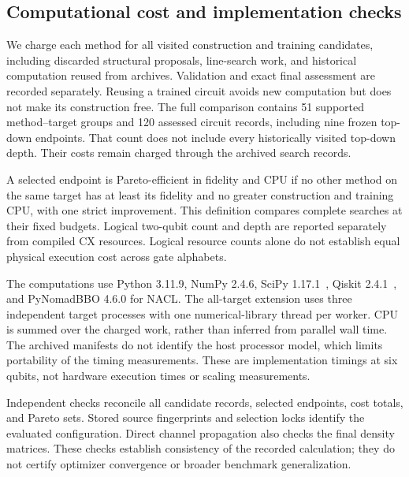 \subsection{Computational cost and implementation checks}

We charge each method for all visited construction and training candidates,
including discarded structural proposals, line-search work, and historical
computation reused from archives. Validation and exact final assessment are
recorded separately. Reusing a trained circuit avoids new computation but
does not make its construction free. The full comparison contains 51
supported method--target groups and 120 assessed circuit records, including
nine frozen top-down endpoints. That count does not include every
historically visited top-down depth. Their costs remain charged through the
archived search records.

A selected endpoint is Pareto-efficient in fidelity and CPU if no other
method on the same target has at least its fidelity and no greater
construction and training CPU, with one strict improvement. This definition
compares complete searches at their fixed budgets. Logical two-qubit count
and depth are reported separately from compiled CX resources. Logical
resource counts alone do not establish equal physical execution cost across
gate alphabets.

The computations use Python 3.11.9, NumPy 2.4.6, SciPy
1.17.1~\cite{Virtanen2020}, Qiskit 2.4.1~\cite{Qiskit2024}, and PyNomadBBO
4.6.0 for NACL. The all-target extension uses three independent target
processes with one numerical-library thread per worker. CPU is summed
over the charged work, rather than inferred from parallel wall time.
The archived manifests do not identify the host processor model, which
limits portability of the timing measurements. These are implementation
timings at six qubits, not hardware execution times or scaling measurements.

Independent checks reconcile all candidate records, selected endpoints,
cost totals, and Pareto sets. Stored source fingerprints and selection
locks identify the evaluated configuration. Direct channel propagation
also checks the final density matrices. These checks establish consistency
of the recorded calculation; they do not certify optimizer convergence or
broader benchmark generalization.

